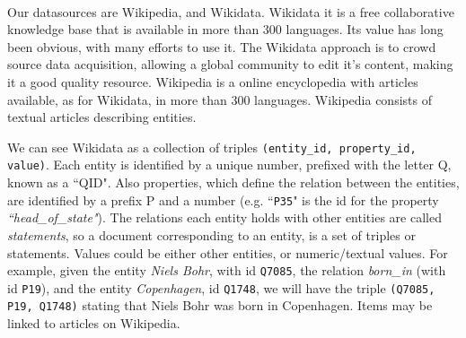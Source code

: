 \paragraph{}
Our datasources are Wikipedia, and Wikidata. Wikidata it is a free collaborative knowledge base that is available in more than 300 languages. Its value has long been obvious, with many efforts to use it. The Wikidata approach is to crowd source data acquisition, allowing a global community to edit it's content, making it a good quality resource.  Wikipedia is a online encyclopedia with articles available, as for Wikidata, in more than 300 languages. Wikipedia consists of textual articles describing entities. %



We can see Wikidata as a collection of triples \texttt{(entity\_id, property\_id, value)}. Each entity is identified by a unique number, prefixed with the letter Q, known as a ``QID". Also properties, which define the relation between the entities, are identified by a prefix P and a number (e.g. ``\texttt{P35}" is the id for the property \textit{``head\_of\_state"}). The relations each entity holds with other entities are called \textit{statements}, so a document corresponding to an entity, is a set of triples or statements. Values could be either other entities, or numeric/textual values.  For example, given the entity \textit{Niels Bohr}, with id \texttt{Q7085}, the relation \textit{born\_in} (with id \texttt{P19}), and the entity \textit{Copenhagen}, id \texttt{Q1748}, we will have the triple \texttt{(Q7085, P19, Q1748)} stating that Niels Bohr was born in Copenhagen. Items may be linked to articles on Wikipedia.



